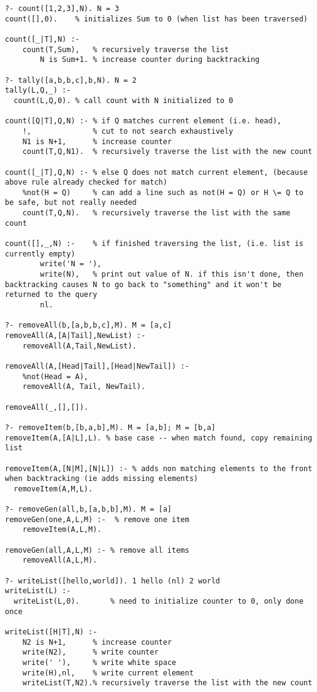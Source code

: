 \documentclass[8pt,letterpaper,twocolumn]{article}
\begin{document}
\begin{verbatim}
?- count([1,2,3],N). N = 3
count([],0).  	% initializes Sum to 0 (when list has been traversed)

count([_|T],N) :-
	count(T,Sum),	% recursively traverse the list	
        N is Sum+1.	% increase counter during backtracking

?- tally([a,b,b,c],b,N). N = 2
tally(L,Q,_) :-
  count(L,Q,0).	% call count with N initialized to 0

count([Q|T],Q,N) :-	% if Q matches current element (i.e. head),
	!,				% cut to not search exhaustively
	N1 is N+1,		% increase counter
	count(T,Q,N1).	% recursively traverse the list with the new count

count([_|T],Q,N) :-	% else Q does not match current element, (because above rule already checked for match)
	%not(H = Q)		% can add a line such as not(H = Q) or H \= Q to be safe, but not really needed
	count(T,Q,N).	% recursively traverse the list with the same count

count([],_,N) :-	% if finished traversing the list, (i.e. list is currently empty)
        write('N = '),
        write(N),	% print out value of N. if this isn't done, then backtracking causes N to go back to "something" and it won't be returned to the query
        nl.

?- removeAll(b,[a,b,b,c],M). M = [a,c]
removeAll(A,[A|Tail],NewList) :-
	removeAll(A,Tail,NewList).

removeAll(A,[Head|Tail],[Head|NewTail]) :-	
	%not(Head = A),	
	removeAll(A, Tail, NewTail).

removeAll(_,[],[]).

?- removeItem(b,[b,a,b],M). M = [a,b]; M = [b,a]
removeItem(A,[A|L],L). % base case -- when match found, copy remaining list

removeItem(A,[N|M],[N|L]) :- % adds non matching elements to the front when backtracking (ie adds missing elements)
  removeItem(A,M,L).

?- removeGen(all,b,[a,b,b],M). M = [a]
removeGen(one,A,L,M) :-  % remove one item
	removeItem(A,L,M).

removeGen(all,A,L,M) :- % remove all items
	removeAll(A,L,M).

?- writeList([hello,world]). 1 hello (nl) 2 world
writeList(L) :-
  writeList(L,0).		% need to initialize counter to 0, only done once

writeList([H|T],N) :-
	N2 is N+1,		% increase counter
	write(N2),		% write counter
	write(' '),		% write white space
	write(H),nl,	% write current element
	writeList(T,N2).% recursively traverse the list with the new count


\end{verbatim}
\end{document}
